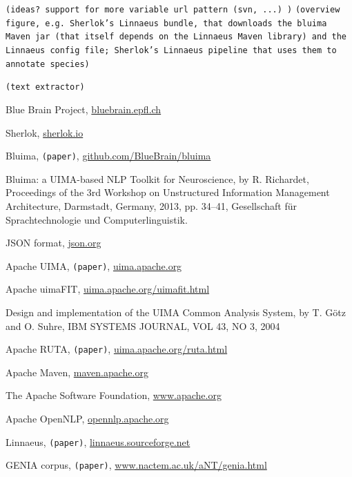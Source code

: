 \documentclass{article}
\newcommand{\TODO}[1]{\texttt{\textcolor{YellowOrange}{(#1)}}} %
\begin{document}
\TODO{ideas? support for more variable url pattern (svn, ...) }
\TODO{overview figure, e.g.  Sherlok's Linnaeus bundle, that downloads the bluima Maven jar (that itself depends on the Linnaeus Maven library) and the Linnaeus config file; Sherlok's Linnaeus pipeline that uses them to annotate species}

\TODO{text extractor}


\begin{thebibliography}{99}

    Blue Brain Project,
    \href{http://bluebrain.epfl.ch/}{bluebrain.epfl.ch}

    Sherlok,
    \href{http://sherlok.io}{sherlok.io}

    Bluima,
	\TODO{paper},
    \href{https://github.com/BlueBrain/bluima}{github.com/BlueBrain/bluima}

    Bluima: a UIMA-based NLP Toolkit for Neuroscience,
    by R. Richardet,
    Proceedings of the 3rd Workshop on Unstructured Information Management Architecture, Darmstadt,
    Germany, 2013, pp. 34–41, Gesellschaft für Sprachtechnologie und Computerlinguistik.

    JSON format,
    \href{http://json.org/}{json.org}

    Apache UIMA,
	\TODO{paper},
    \href{https://uima.apache.org/}{uima.apache.org}

    Apache uimaFIT,
    \href{https://uima.apache.org/uimafit.html}{uima.apache.org/uimafit.html}

    Design and implementation of the UIMA Common Analysis System,
    by T. Götz and O. Suhre,
    IBM SYSTEMS JOURNAL, VOL 43, NO 3, 2004

    Apache RUTA,
	\TODO{paper},
    \href{https://uima.apache.org/ruta.html}{uima.apache.org/ruta.html}

    Apache Maven,
    \href{https://maven.apache.org/}{maven.apache.org}

    The Apache Software Foundation,
    \href{http://www.apache.org/}{www.apache.org}

    Apache OpenNLP,
    \href{https://opennlp.apache.org/}{opennlp.apache.org}

    Linnaeus,
	\TODO{paper},
    \href{http://linnaeus.sourceforge.net/}{linnaeus.sourceforge.net}

    GENIA corpus,
	\TODO{paper},
    \href{http://www.nactem.ac.uk/aNT/genia.html}{www.nactem.ac.uk/aNT/genia.html}


\end{thebibliography}

\end{document}
